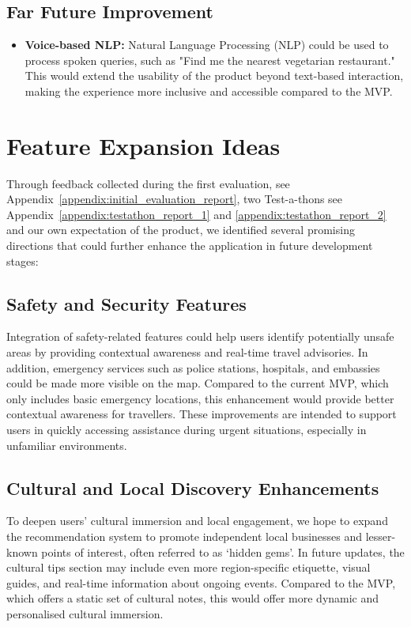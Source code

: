 \subsection{Far Future Improvement}
    \begin{itemize}
        \item \textbf{Voice-based NLP:} Natural Language Processing (NLP) could be used to process spoken queries, such as "Find me the nearest vegetarian restaurant." This would extend the usability of the product beyond text-based interaction, making the experience more inclusive and accessible compared to the MVP.
    \end{itemize}

\section{Feature Expansion Ideas}
Through feedback collected during the first evaluation, see Appendix~\ref{appendix:initial_evaluation_report}, two Test-a-thons see Appendix~\ref{appendix:testathon_report_1} and \ref{appendix:testathon_report_2} and our own expectation of the product, we identified several promising directions that could further enhance the application in future development stages:

\subsection{Safety and Security Features}
Integration of safety-related features could help users identify potentially unsafe areas by providing contextual awareness and real-time travel advisories. In addition, emergency services such as police stations, hospitals, and embassies could be made more visible on the map. Compared to the current MVP, which only includes basic emergency locations, this enhancement would provide better contextual awareness for travellers. These improvements are intended to support users in quickly accessing assistance during urgent situations, especially in unfamiliar environments.

\subsection{Cultural and Local Discovery Enhancements}
To deepen users’ cultural immersion and local engagement, we hope to expand the recommendation system to promote independent local businesses and lesser-known points of interest, often referred to as ‘hidden gems’. In future updates, the cultural tips section may include even more region-specific etiquette, visual guides, and real-time information about ongoing events. Compared to the MVP, which offers a static set of cultural notes, this would offer more dynamic and personalised cultural immersion.

